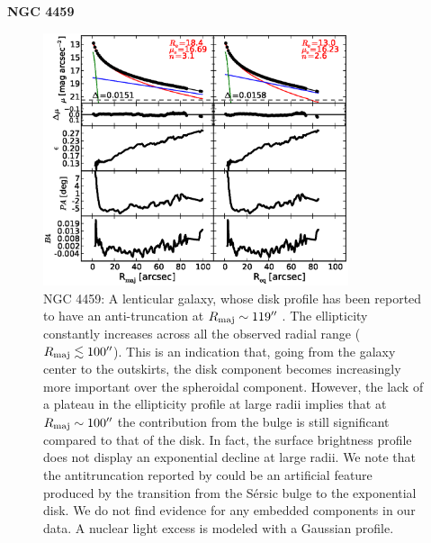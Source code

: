 \documentclass[preprint2]{emulateapj}
\newcommand{\fitfigurewidth}{0.8\textwidth}
\begin{document}
  \clearpage\newpage\noindent
  {\bf NGC 4459 \\}

  \begin{figure}[h]
  \begin{center}
  \includegraphics[width=\fitfigurewidth]{n4459_1Dfit.eps}
  \caption{NGC 4459: 
  A lenticular galaxy, 
  whose disk profile has been reported to have an anti-truncation at $R_{\rm maj} \sim 119''$ \citep{gutierrez2011}.
  The ellipticity constantly increases across all the observed radial range ($R_{\rm maj} \lesssim 100''$).
  This is an indication that, going from the galaxy center to the outskirts,
  the disk component becomes increasingly more important over the spheroidal component.
  However, the lack of a plateau in the ellipticity profile at large radii implies that at $R_{\rm maj} \sim 100''$ 
  the contribution from the bulge is still significant compared to that of the disk.
  In fact, the surface brightness profile does not display an exponential decline at large radii.
  We note that the antitruncation reported by \cite{gutierrez2011} could be an artificial feature 
  produced by the transition from the S\'ersic bulge to the exponential disk.
  We do not find evidence for any embedded components in our data.
  A nuclear light excess is modeled with a Gaussian profile.
  }
  \end{center}
  \end{figure}
\end{document}

